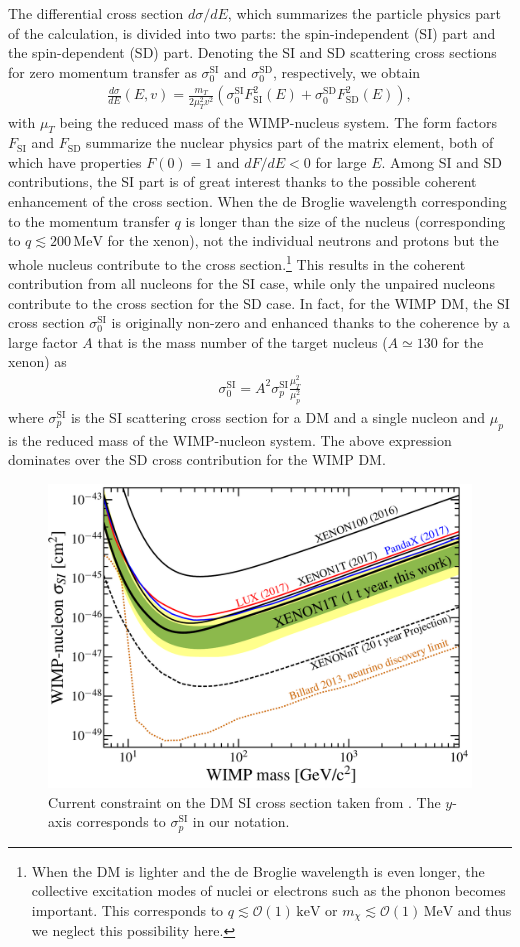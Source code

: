 \documentclass[12pt,twoside,book]{article}
\begin{document}
The differential cross section $d\sigma / dE$, which summarizes the particle physics part of the calculation, is divided into two parts: the spin-independent (SI) part and the spin-dependent (SD) part.
Denoting the SI and SD scattering cross sections for zero momentum transfer as $\sigma_0^{\mathrm{SI}}$ and $\sigma_0^{\mathrm{SD}}$, respectively, we obtain
\begin{align}
  \frac{d\sigma}{d E} (E, v) = \frac{m_T}{2 \mu_T^2 v^2}
  \left( \sigma_0^{\mathrm{SI}} F_{\mathrm{SI}}^2 (E)
  + \sigma_0^{\mathrm{SD}} F_{\mathrm{SD}}^2 (E) \right),
\end{align}
with $\mu_T$ being the reduced mass of the WIMP-nucleus system.
The form factors $F_{\mathrm{SI}}$ and $F_{\mathrm{SD}}$ summarize the nuclear physics part of the matrix element, both of which have properties $F(0)=1$ and $dF / dE < 0$ for large $E$.
Among SI and SD contributions, the SI part is of great interest thanks to the possible coherent enhancement of the cross section.
When the de Broglie wavelength corresponding to the momentum transfer $q$ is longer than the size of the nucleus (corresponding to $q \lesssim 200\,\mathrm{MeV}$ for the xenon), not the individual neutrons and protons but the whole nucleus contribute to the cross section.\footnote{
  When the DM is lighter and the de Broglie wavelength is even longer, the collective excitation modes of nuclei or electrons such as the phonon becomes important.
  This corresponds to $q \lesssim \mathcal{O}(1)\,\mathrm{keV}$ or $m_\chi \lesssim \mathcal{O}(1)\,\mathrm{MeV}$ and thus we neglect this possibility here.
}
This results in the coherent contribution from all nucleons for the SI case, while only the unpaired nucleons contribute to the cross section for the SD case.
In fact, for the WIMP DM, the SI cross section $\sigma_0^{\mathrm{SI}}$ is originally non-zero and enhanced thanks to the coherence by a large factor $A$ that is the mass number of the target nucleus ($A \simeq 130$ for the xenon) as
\begin{align}
  \sigma_0^{\mathrm{SI}} = A^2 \sigma_p^{\mathrm{SI}} \frac{\mu_T^2}{\mu_p^2}
\end{align}
where $\sigma_p^{\mathrm{SI}}$ is the SI scattering cross section for a DM and a single nucleon and $\mu_p$ is the reduced mass of the WIMP-nucleon system.
The above expression dominates over the SD cross contribution for the WIMP DM.

\begin{figure}[t]
  \centering
  \includegraphics[width=0.5\hsize]{x1t_prelim_limits.pdf}
  \caption{
    Current constraint on the DM SI cross section taken from \cite{Aprile:2018dbl}.
    The $y$-axis corresponds to $\sigma_p^{\mathrm{SI}}$ in our notation.
  }
  \label{fig:XENON1T}
\end{figure}
\end{document}
